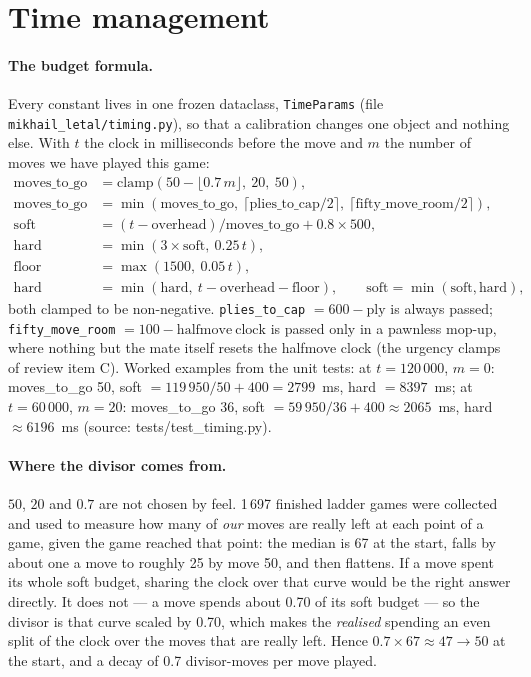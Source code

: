 \documentclass[11pt,a4paper]{article}
\newcommand{\src}[1]{{\small(source: #1)}}
\newcommand{\code}[1]{\texttt{#1}}
\begin{document}
\section{Time management}\label{sec:time}
\paragraph{The budget formula.} Every constant lives in one frozen dataclass, \code{TimeParams}
(file \code{mikhail\_letal/timing.py}), so that a calibration changes one object and nothing else. With
$t$ the clock in milliseconds before the move and $m$ the number of moves we have played this game:
\begin{align*}
  \mathrm{moves\_to\_go} &= \mathrm{clamp}(50 - \lfloor 0.7\,m \rfloor,\ 20,\ 50), \\
  \mathrm{moves\_to\_go} &= \min(\mathrm{moves\_to\_go},\ \lceil \mathrm{plies\_to\_cap}/2 \rceil,\ \lceil \mathrm{fifty\_move\_room}/2 \rceil), \\
  \mathrm{soft} &= (t - \mathrm{overhead}) / \mathrm{moves\_to\_go} + 0.8 \times 500, \\
  \mathrm{hard} &= \min(3 \times \mathrm{soft},\ 0.25\, t), \\
  \mathrm{floor} &= \max(1500,\ 0.05\, t), \\
  \mathrm{hard} &= \min(\mathrm{hard},\ t - \mathrm{overhead} - \mathrm{floor}), \qquad \mathrm{soft} = \min(\mathrm{soft}, \mathrm{hard}),
\end{align*}
both clamped to be non-negative. \code{plies\_to\_cap} $= 600 - \mathrm{ply}$ is always passed;
\code{fifty\_move\_room} $= 100 - \mathrm{halfmove\ clock}$ is passed only in a pawnless mop-up, where
nothing but the mate itself resets the halfmove clock (the urgency clamps of review item C). Worked
examples from the unit tests: at $t = 120\,000$, $m = 0$: moves\_to\_go 50, soft $= 119\,950/50 + 400 =
2799$~ms, hard $= 8397$~ms; at $t = 60\,000$, $m = 20$: moves\_to\_go 36, soft $= 59\,950/36 + 400 \approx
2065$~ms, hard $\approx 6196$~ms \src{tests/test\_timing.py}.

\paragraph{Where the divisor comes from.} $50$, $20$ and $0.7$ are not chosen by feel. 1\,697 finished
ladder games were collected and used to measure how many of \emph{our} moves are really left at each
point of a game, given the game reached that point: the median is 67 at the start, falls by about one a
move to roughly 25 by move 50, and then flattens. If a move spent its whole soft budget, sharing the clock
over that curve would be the right answer directly. It does not --- a move spends about 0.70 of its soft
budget --- so the divisor is that curve scaled by 0.70, which makes the \emph{realised} spending an even
split of the clock over the moves that are really left. Hence $0.7 \times 67 \approx 47 \rightarrow 50$ at
the start, and a decay of 0.7 divisor-moves per move played.
\end{document}
